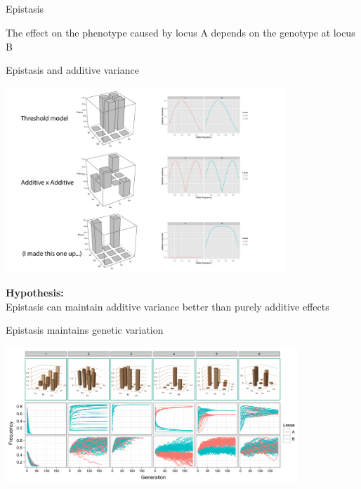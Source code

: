 \documentclass{beamer}
\begin{document}
\subsection{}

\begin{frame}{Epistasis}
\begin{definition}
{\color{orange} The effect on the phenotype caused by locus A depends on the genotype at locus B }
\end{definition}
\end{frame}

\begin{frame}{Epistasis and additive variance}
\begin{center}
\includegraphics[height=7cm]{gp_va}
\end{center}
\end{frame}

\begin{frame}{}
\textbf{Hypothesis:}\\ Epistasis can maintain additive variance better than purely additive effects
\end{frame}


\begin{frame}{Epistasis maintains genetic variation}
\begin{center}
\includegraphics[width=11cm]{maps_freqs}
\end{center}
\end{frame}
\end{document}
